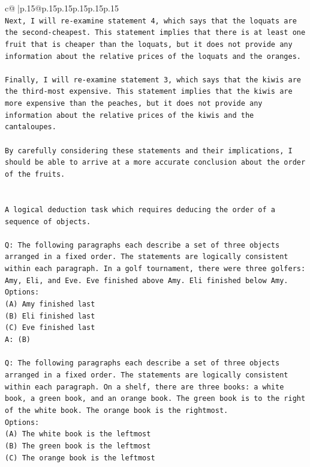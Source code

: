 \documentclass{article}
\begin{document}
{\begin{supertabular}{c@{$\;$}|p{.15\linewidth}@{}p{.15\linewidth}p{.15\linewidth}p{.15\linewidth}p{.15\linewidth}p{.15\linewidth}}
{{{\\ 
\texttt{Next, I will re{-}examine statement 4, which says that the loquats are the second{-}cheapest. This statement implies that there is at least one fruit that is cheaper than the loquats, but it does not provide any information about the relative prices of the loquats and the oranges.} \\
\\ 
\texttt{Finally, I will re{-}examine statement 3, which says that the kiwis are the third{-}most expensive. This statement implies that the kiwis are more expensive than the peaches, but it does not provide any information about the relative prices of the kiwis and the cantaloupes.} \\
\\ 
\texttt{By carefully considering these statements and their implications, I should be able to arrive at a more accurate conclusion about the order of the fruits.} \\
\\ 
\\ 
\texttt{A logical deduction task which requires deducing the order of a sequence of objects.} \\
\\ 
\texttt{Q: The following paragraphs each describe a set of three objects arranged in a fixed order. The statements are logically consistent within each paragraph. In a golf tournament, there were three golfers: Amy, Eli, and Eve. Eve finished above Amy. Eli finished below Amy.} \\
\texttt{Options:} \\
\texttt{(A) Amy finished last} \\
\texttt{(B) Eli finished last} \\
\texttt{(C) Eve finished last} \\
\texttt{A: (B)} \\
\\ 
\texttt{Q: The following paragraphs each describe a set of three objects arranged in a fixed order. The statements are logically consistent within each paragraph. On a shelf, there are three books: a white book, a green book, and an orange book. The green book is to the right of the white book. The orange book is the rightmost.} \\
\texttt{Options:} \\
\texttt{(A) The white book is the leftmost} \\
\texttt{(B) The green book is the leftmost} \\
\texttt{(C) The orange book is the leftmost} \\
}}}
\end{supertabular}}
\end{document}
